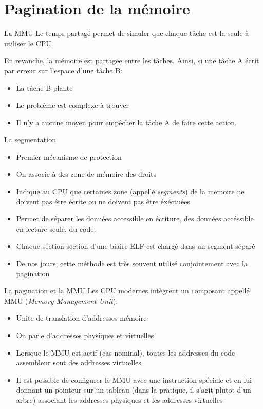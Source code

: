 \section{Pagination de la mémoire}

\begin{frame}{La MMU}
  Le temps partagé  permet de simuler que chaque tâche  est la seule à
  utiliser le CPU.

  En revanche, la mémoire est partagée entre les tâches. Ainsi, si une
  tâche A écrit par erreur sur l'espace d'une tâche B:
  \begin{itemize}
  \item  La tâche B plante
  \item  Le problème est complexe à trouver
  \item Il  n'y a  aucune moyen  pour empêcher la  tâche A  de faire
    cette action.
  \end{itemize}
\end{frame}

\begin{frame}[fragile=singleslide]{La segmentation}
  \begin{itemize}
    \item Premier mécanisme de protection
    \item On associe à des zone de mémoire des droits
    \item Indique au CPU  que certaines zone (appellé \emph{segments})
      de la mémoire ne doivent pas  être écrite ou ne doivent pas être
      éxéctuées
    \item Permet  de séparer les  données accessible en  écriture, des
      données accéssible en lecture seule, du code.
    \item Chaque section  section d'une biaire ELF est  chargé dans un
      segment séparé
    \item  De  nos  jours,  cette  méthode est  très  souvent  utilisé
      conjointement avec la pagination
  \end{itemize}
\end{frame}

\begin{frame}{La pagination et la MMU}
  Les CPU  modernes intègrent  un composant appellé  MMU (\emph{Memory
    Management Unit}):
  \begin{itemize}
  \item  Unite de translation d'addresses mémoire
  \item  On parle d'addresses physiques et virtuelles
  \item Lorsque le  MMU est actif (cas nominal),  toutes les addresses
    du code assembleur sont des addresses virtuelles
  \item  Il est  possible de  configurer le  MMU avec  une instruction
    spéciale et  en lui  donnant un pointeur  sur un tableau  (dans la
    pratique,  il s'agit  plutot d'un  arbre) associant  les addresses
    physiques et les addresses virtuelles
  \end{itemize}
\end{frame}

